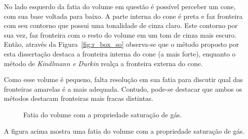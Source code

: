 	No lado esquerdo da fatia do volume em questão é possível perceber um cone, com sua base voltada para baixo. A parte interna do cone é preta e faz fronteira com seu contorno que possui uma tonalidade de cinza claro. Este contorno por sua vez, faz fronteira com o resto do volume em um tom de cinza mais escuro. Então, através da Figura~\ref{fig:r_box_so} observa-se que o método proposto por esta dissertação destaca a fronteira interna do cone (a mais forte), enquanto o método de \textit{Kindlmann e Durkin} realça a fronteira externa do cone.
	
	Como esse volume é pequeno, falta resolução em sua fatia para discutir qual das fronteiras amarelas é a mais adequada. Contudo, pode-se destacar que ambos os métodos destacam fronteiras mais fracas distintas.

\begin{figure}[h]
	\centering
	\caption{Fatia do volume  com a propriedade saturação de gás.}
\end{figure}

	A figura acima mostra uma fatia do volume  com a propriedade saturação de gás.

